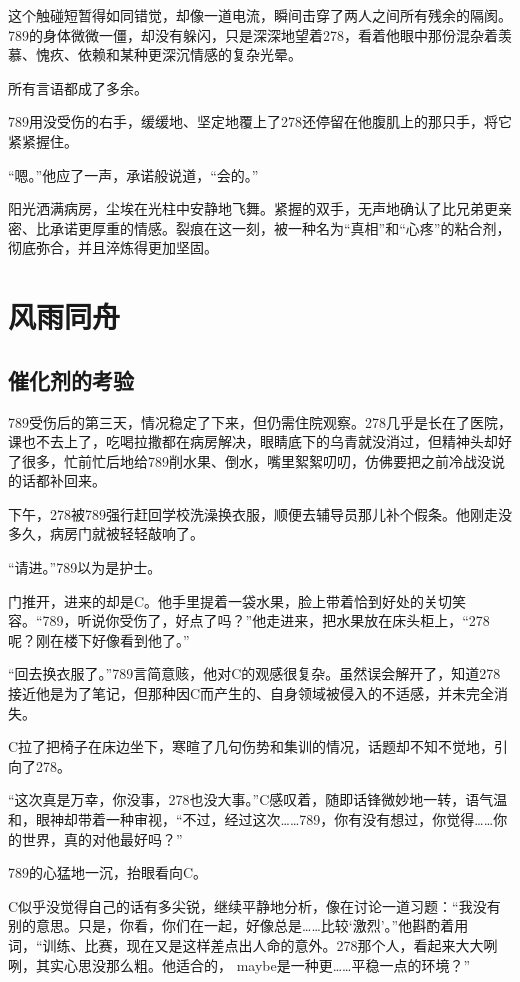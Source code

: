\documentclass[a4paper]{book}
\begin{document}
这个触碰短暂得如同错觉，却像一道电流，瞬间击穿了两人之间所有残余的隔阂。789的身体微微一僵，却没有躲闪，只是深深地望着278，看着他眼中那份混杂着羡慕、愧疚、依赖和某种更深沉情感的复杂光晕。

所有言语都成了多余。

789用没受伤的右手，缓缓地、坚定地覆上了278还停留在他腹肌上的那只手，将它紧紧握住。

“嗯。”他应了一声，承诺般说道，“会的。”

阳光洒满病房，尘埃在光柱中安静地飞舞。紧握的双手，无声地确认了比兄弟更亲密、比承诺更厚重的情感。裂痕在这一刻，被一种名为“真相”和“心疼”的粘合剂，彻底弥合，并且淬炼得更加坚固。
\newpage
\large
\chapter{风雨同舟}
\normalsize
\section{催化剂的考验}
\songti{}
789受伤后的第三天，情况稳定了下来，但仍需住院观察。278几乎是长在了医院，课也不去上了，吃喝拉撒都在病房解决，眼睛底下的乌青就没消过，但精神头却好了很多，忙前忙后地给789削水果、倒水，嘴里絮絮叨叨，仿佛要把之前冷战没说的话都补回来。

下午，278被789强行赶回学校洗澡换衣服，顺便去辅导员那儿补个假条。他刚走没多久，病房门就被轻轻敲响了。

“请进。”789以为是护士。

门推开，进来的却是C。他手里提着一袋水果，脸上带着恰到好处的关切笑容。“789，听说你受伤了，好点了吗？”他走进来，把水果放在床头柜上，“278呢？刚在楼下好像看到他了。”

“回去换衣服了。”789言简意赅，他对C的观感很复杂。虽然误会解开了，知道278接近他是为了笔记，但那种因C而产生的、自身领域被侵入的不适感，并未完全消失。

C拉了把椅子在床边坐下，寒暄了几句伤势和集训的情况，话题却不知不觉地，引向了278。

“这次真是万幸，你没事，278也没大事。”C感叹着，随即话锋微妙地一转，语气温和，眼神却带着一种审视，“不过，经过这次……789，你有没有想过，你觉得……你的世界，真的对他最好吗？”

789的心猛地一沉，抬眼看向C。

C似乎没觉得自己的话有多尖锐，继续平静地分析，像在讨论一道习题：“我没有别的意思。只是，你看，你们在一起，好像总是……比较‘激烈’。”他斟酌着用词，“训练、比赛，现在又是这样差点出人命的意外。278那个人，看起来大大咧咧，其实心思没那么粗。他适合的， maybe是一种更……平稳一点的环境？”
\end{document}
